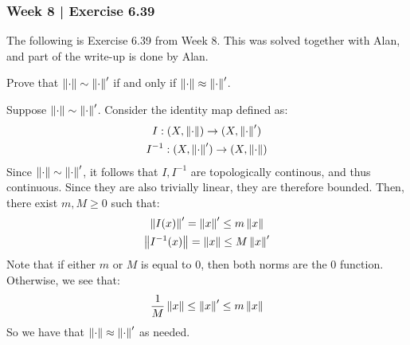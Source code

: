 \newpage
\subsubsection{Week 8 | Exercise 6.39}

The following is Exercise 6.39 from Week 8.
This was solved together with Alan, and part of the write-up is done by Alan.

\begin{exr}[num=6.39]
    Prove that $ \left\|\cdot\right\| \sim \left\|\cdot\right\|' $ if and only if
    $ \left\|\cdot\right\| \approx \left\|\cdot\right\|' $.
\end{exr}

\begin{pf}[source=Me]
    Suppose $ \left\|\cdot\right\| \sim \left\|\cdot\right\|' $. Consider the identity map
    defined as:
    \begin{gather*}
        I : (X, \left\|\cdot\right\|) \rightarrow (X, \left\|\cdot\right\|') \\
        I^{-1} : (X, \left\|\cdot\right\|') \rightarrow (X, \left\|\cdot\right\|)
    \end{gather*}
    Since $ \left\|\cdot\right\| \sim \left\|\cdot\right\|' $, it follows that $ I, I^{-1} $ are
    topologically continous, and thus continuous. Since they are also trivially
    linear, they are therefore bounded. Then, there exist $ m, M \geq 0 $ such
    that:
    \begin{gather*}
        \left\|I(x)\right\|' = \left\|x\right\|' \leq m \left\|x\right\| \\
        \left\|I^{-1}(x)\right\| = \left\|x\right\| \leq M \left\|x\right\|'
    \end{gather*}
    Note that if either $ m $ or $ M $ is equal to $ 0 $, then both norms are the
    $ 0 $ function. Otherwise, we see that:
    \begin{equation*}
        \frac{1}{M}\left\|x\right\| \leq \left\|x\right\|' \leq m\left\|x\right\|
    \end{equation*}
    So we have that $ \left\|\cdot\right\| \approx \left\|\cdot\right\|' $ as needed.
\end{pf}

